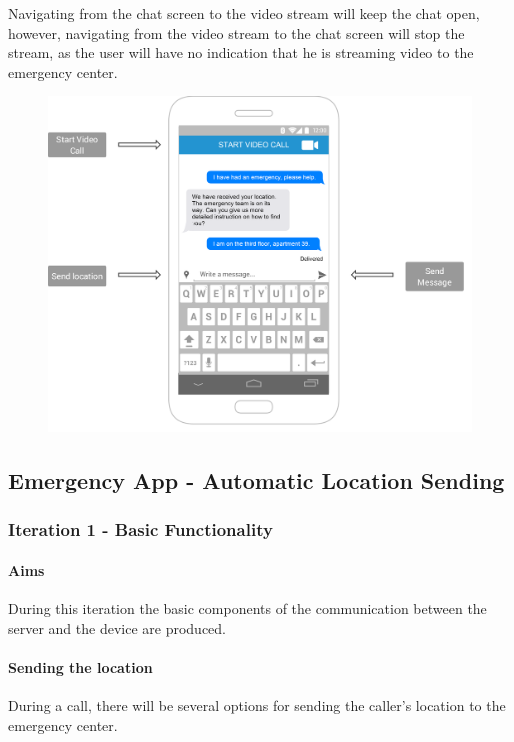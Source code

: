 \documentclass{article}
\begin{document}
Navigating from the chat screen to the video stream will keep the chat open, however, navigating from the video stream to the chat screen will stop the stream, as the user will have no indication that he is streaming video to the emergency center.

	\begin{figure}[H]
		\centering
		\includegraphics[width=1\textwidth]{"ChatIteration2/chat (1)"}
	\end{figure}



\pagebreak
	\subsection{Emergency App - Automatic Location Sending}
		\subsubsection{Iteration 1 - Basic Functionality}
			\paragraph{Aims}
			During this iteration the basic components of the communication between the server and the device are produced.

	\paragraph{Sending the location}
	During a call, there will be several options for sending the caller’s location to the emergency center.\\
\end{document}
